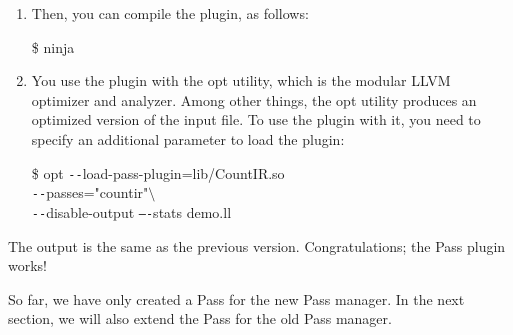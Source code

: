 \begin{enumerate}
	\item Then, you can compile the plugin, as follows:
	\begin{tcolorbox}[colback=white,colframe=black]
		\$ ninja
	\end{tcolorbox}
	
	\item You use the plugin with the opt utility, which is the modular LLVM optimizer and analyzer. Among other things, the opt utility produces an optimized version of the input file. To use the plugin with it, you need to specify an additional parameter to load the plugin:
	\begin{tcolorbox}[colback=white,colframe=black]
		\$ opt \verb|--|load-pass-plugin=lib/CountIR.so \\
		\verb|--|passes="countir"$\setminus$ \\
		\hspace*{0.5cm}\verb|--|disable-output \verb|–-|stats demo.ll
	\end{tcolorbox}
	
\end{enumerate}

The output is the same as the previous version. Congratulations; the Pass plugin works!\par

So far, we have only created a Pass for the new Pass manager. In the next section, we will also extend the Pass for the old Pass manager.\par




















